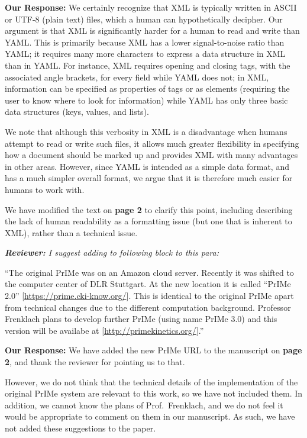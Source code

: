 \documentclass[a4paper,10pt]{elsarticle}
\newenvironment{reviewer}{\vspace{0.5\baselineskip}\begingroup\itshape\textbf{Reviewer:}}{\endgroup}
\newenvironment{response}{\textbf{Our Response:}}{\vspace{0.5\baselineskip}}
\begin{document}
\begin{response}
    We certainly recognize that XML is typically written in ASCII or UTF-8 (plain text) files, which
    a human can hypothetically decipher. Our argument is that XML is significantly harder for a
    human to read and write than YAML. This is primarily because XML has a lower signal-to-noise
    ratio than YAML; it requires many more characters to express a data structure in XML than in
    YAML. For instance, XML requires opening and closing tags, with the associated angle brackets,
    for every field while YAML does not; in XML, information can be specified as properties of tags
    or as elements (requiring the user to know where to look for information) while YAML has only
    three basic data structures (keys, values, and lists).

    We note that although this verbosity in XML is a disadvantage when humans attempt to read or
    write such files, it allows much greater flexibility in specifying how a document should be
    marked up and provides XML with many advantages in other areas. However, since YAML is intended
    as a simple data format, and has a much simpler overall format, we argue that it is therefore
    much easier for humans to work with.

    We have modified the text on \textbf{page 2} to clarify this point, including describing the lack of human
    readability as a formatting issue (but one that is inherent to XML), rather than a technical
    issue.
\end{response}

\begin{reviewer}
    I suggest adding to following block to this para:

    ``The original PrIMe was on an Amazon cloud server. Recently it was shifted to the computer
    center of DLR Stuttgart. At the new location it is called ``PrIMe 2.0''
    [\url{https://prime.cki-know.org/}]. This is identical to the original PrIMe apart from
    technical changes due to the different computation background. Professor Frenklach plans to
    develop further PrIMe (using name PrIMe 3.0) and this version will be availabe at
    [\url{http://primekinetics.org/}].''
\end{reviewer}

\begin{response}
    We have added the new PrIMe URL to the manuscript on \textbf{page 2}, and thank the reviewer for pointing us to that.

    However, we do not think that the technical details of the implementation of the original PrIMe system
    are relevant to this work, so we have not included them. In addition, we cannot know
    the plans of Prof.~Frenklach, and we do not feel it would be appropriate to comment on them in
    our manuscript. As such, we have not added these suggestions to the paper.
\end{response}
\end{document}
